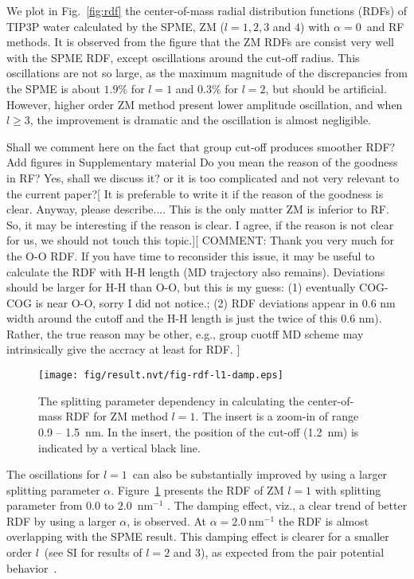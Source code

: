 \documentclass[a4paper,preprint,unsortedaddress,onecolumn,fleqn]{revtex4}
\begin{document}
We plot in Fig.~\ref{fig:rdf} the center-of-mass radial distribution
functions (RDFs) of TIP3P water calculated by the SPME, ZM ($l=1,2,3$ and $4$)
with $\alpha =0$\ and RF methods. It is observed from the figure that the
ZM RDFs are consist very well with the SPME RDF, except oscillations around
the cut-off radius. This oscillations are not so large, as the maximum
magnitude of the discrepancies from the SPME is about $1.9\%$
for $l=1$ and ${0.3\%}$ for $l=2$, %
but should be artificial. However, higher order
ZM method present lower amplitude oscillation, and when $l\geq 3$, the
improvement is dramatic and the oscillation is almost negligible.

{\color{red} Shall we comment here on the fact that group cut-off produces
smoother RDF? Add figures in Supplementary material {\color{blue} Do you
mean the reason of the goodness in RF?} {\color{red} Yes, shall we discuss
it? or it is too complicated and not very relevant to the current paper?}[} {%
\color{blue} It is preferable to write it if the reason of the goodness is
clear. Anyway, please describe.... This is the only matter ZM is inferior to
RF. So, it may be interesting if the reason is clear. } {\color{red} I
agree, if the reason is not clear for us, we should not touch this topic.}][ 
{\color{blue} COMMENT: Thank you very much for the O-O RDF. If you have time
to reconsider this issue, it may be useful to calculate the RDF with H-H
length (MD trajectory also remains). Deviations should be larger for H-H
than O-O, but this is my guess: (1) eventually COG-COG is near O-O, sorry I
did not notice.; (2) RDF deviations appear in 0.6 nm width around the cutoff
and the H-H length is just the twice of this 0.6 nm). Rather, the true
reason may be other, e.g., group cuotff MD scheme may intrinsically give the
accracy at least for RDF. }]

\begin{figure}[tbp]
\centering
\texttt{[image: fig/result.nvt/fig-rdf-l1-damp.eps]}
\caption{ The splitting parameter dependency in calculating the
center-of-mass RDF for ZM method $l=1$. The insert is a zoom-in of range 0.9
-- 1.5~nm. In the insert, the position of the cut-off (1.2~nm) is indicated
by a vertical black line. }
\label{fig:rdf-damp}
\end{figure}

The oscillations for $l=1$\ can also be substantially improved by using a
larger splitting parameter $\alpha $. Figure~\ref{fig:rdf-damp} presents the
RDF of ZM $l=1$ with splitting parameter from $0.0$ to $2.0$~$\text{nm}^{-1}$%
. The damping effect, viz., a clear trend of better RDF by using a larger $%
\alpha $, is observed. At $\alpha =2.0\ \text{nm}^{-1}$ the RDF is almost
overlapping with the SPME result. This damping effect is clearer for a
smaller order $l$\ (see SI for results of {$l=2$ and $3$}), as expected from
the pair potential behavior~\cite{fukuda2014zero}.
\end{document}
